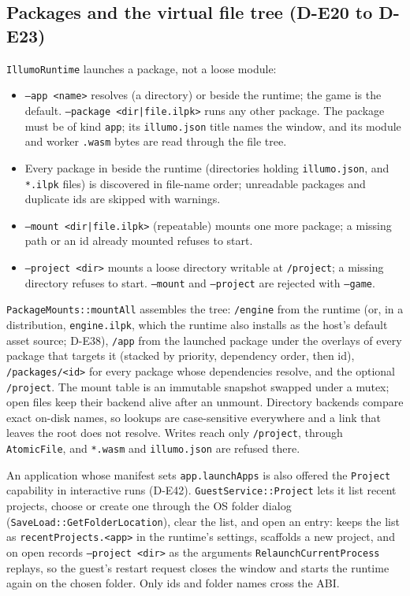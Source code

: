 \subsection{Packages and the virtual file tree (D-E20 to D-E23)}
\texttt{IllumoRuntime} launches a package, not a loose module:
\begin{itemize}
  \item \texttt{--app <name>} resolves  (a directory)
        or  beside the runtime; the game is the
        default. \texttt{--package <dir|file.ilpk>} runs any other package.
        The package must be of kind \texttt{app}; its \texttt{illumo.json}
        title names the window, and its module and worker \texttt{.wasm}
        bytes are read through the file tree.
  \item Every package in  beside the runtime (directories
        holding \texttt{illumo.json}, and \texttt{*.ilpk} files) is discovered
        in file-name order; unreadable packages and duplicate ids are skipped
        with warnings.
  \item \texttt{--mount <dir|file.ilpk>} (repeatable) mounts one more package;
        a missing path or an id already mounted refuses to start.
  \item \texttt{--project <dir>} mounts a loose directory writable at
        \texttt{/project}; a missing directory refuses to start.
        \texttt{--mount} and \texttt{--project} are rejected with
        \texttt{--game}.
\end{itemize}
\texttt{PackageMounts::mountAll} assembles the tree: \texttt{/engine} from the
runtime  (or, in a distribution, \texttt{engine.ilpk}, which
the runtime also installs as the host's default asset source; D-E38),
\texttt{/app} from the launched package under the
overlays of every package that targets it (stacked by priority, dependency
order, then id), \texttt{/packages/<id>} for every package whose dependencies
resolve, and the optional \texttt{/project}. The mount table is an immutable
snapshot swapped under a mutex; open files keep their backend alive after an
unmount. Directory backends compare exact on-disk names, so lookups are
case-sensitive everywhere and a link that leaves the root does not resolve.
Writes reach only \texttt{/project}, through \texttt{AtomicFile}, and
\texttt{*.wasm} and \texttt{illumo.json} are refused there.

An application whose manifest sets \texttt{app.launchApps} is also offered the
\texttt{Project} capability in interactive runs (D-E42).
\texttt{GuestService::Project} lets it list recent projects, choose or create
one through the OS folder dialog (\texttt{SaveLoad::GetFolderLocation}),
clear the list, and open an entry:  keeps the
list as \texttt{recentProjects.<app>} in the runtime's settings, scaffolds a
new project, and on open records \texttt{--project <dir>} as the arguments
\texttt{RelaunchCurrentProcess} replays, so the guest's restart request
closes the window and starts the runtime again on the chosen folder. Only ids
and folder names cross the ABI.

